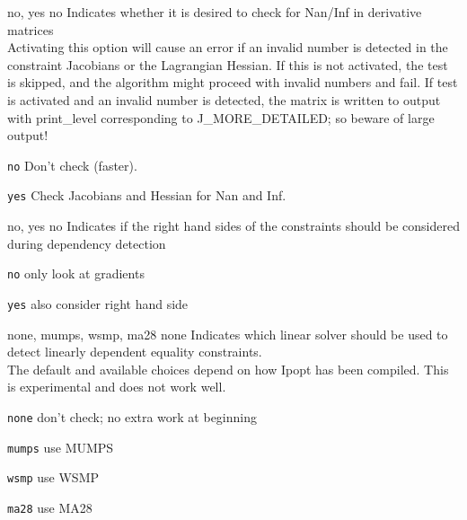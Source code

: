 %
{\ttfamily no, yes}%
{no}%
{Indicates whether it is desired to check for Nan/Inf in derivative matrices\\
Activating this option will cause an error if an invalid number is detected in the constraint Jacobians or the Lagrangian Hessian.  If this is not activated, the test is skipped, and the algorithm might proceed with invalid numbers and fail.  If test is activated and an invalid number is detected, the matrix is written to output with print\_level corresponding to J\_MORE\_DETAILED; so beware of large output!}%
{\begin{list}{}{
\setlength{\parsep}{0em}
\setlength{\leftmargin}{5ex}
\setlength{\labelwidth}{2ex}
\setlength{\itemindent}{0ex}
\setlength{\topsep}{0pt}}
\item[\texttt{no}] Don't check (faster).
\item[\texttt{yes}] Check Jacobians and Hessian for Nan and Inf.
\end{list}
}

%
{\ttfamily no, yes}%
{no}%
{Indicates if the right hand sides of the constraints should be considered during dependency detection}%
{\begin{list}{}{
\setlength{\parsep}{0em}
\setlength{\leftmargin}{5ex}
\setlength{\labelwidth}{2ex}
\setlength{\itemindent}{0ex}
\setlength{\topsep}{0pt}}
\item[\texttt{no}] only look at gradients
\item[\texttt{yes}] also consider right hand side
\end{list}
}

%
{\ttfamily none, mumps, wsmp, ma28}%
{none}%
{Indicates which linear solver should be used to detect linearly dependent equality constraints.\\
The default and available choices depend on how Ipopt has been compiled.  This is experimental and does not work well.}%
{\begin{list}{}{
\setlength{\parsep}{0em}
\setlength{\leftmargin}{5ex}
\setlength{\labelwidth}{2ex}
\setlength{\itemindent}{0ex}
\setlength{\topsep}{0pt}}
\item[\texttt{none}] don't check; no extra work at beginning
\item[\texttt{mumps}] use MUMPS
\item[\texttt{wsmp}] use WSMP
\item[\texttt{ma28}] use MA28
\end{list}
}

